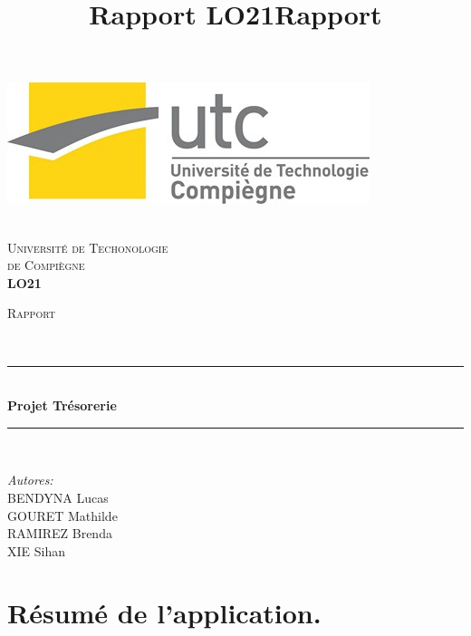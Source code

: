 \documentclass[10pt,a4paper,openany]{report}
\title{Rapport LO21}
\title{Rapport}
\begin{document}
	\begin{center}																		
		\newcommand{\HRule}{\rule{\linewidth}{0.5mm}}									
		\begin{minipage}{\textwidth} \begin{flushleft}
				\includegraphics[scale = 0.5]{utc_logo.jpg}
		\end{flushleft}\end{minipage}
		\\[1.0cm]
		\textsc{\huge Université de Techonologie\\ \vspace{5px} de Compiègne}\\[1.0cm]	
		\textsc{\LARGE\textbf{LO21}}\\[1.0cm]													
		\begin{minipage}{0.9\textwidth} 
			\begin{center}																	
				\textsc{\LARGE Rapport}
			\end{center}
		\end{minipage}\\[0.5cm]
		\vspace*{1cm}
		\HRule \\[0.4cm]
		{ \huge \bfseries Projet Trésorerie}\\[0.4cm]
		\HRule \\[1.5cm]
		\begin{minipage}{0.3\textwidth}
			\begin{flushleft} \large
				\emph{Autores:}\\
				BENDYNA Lucas\\
				GOURET Mathilde\\
				RAMIREZ Brenda\\
				XIE Sihan\\	 
			\end{flushleft}
		\end{minipage}					
	\end{center}							 
	\newpage								
	\tableofcontents 
	\newpage
	\section{Résumé de l'application.}
	
\end{document}
